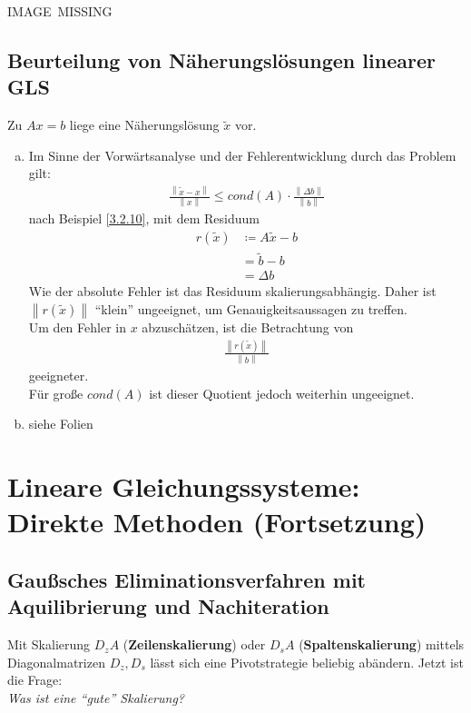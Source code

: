 \documentclass[ngerman,fontsize=11pt, paper=a4, parskip=half, titlepage=true, toc=bib]{scrbook}
\newcommand{\nn}[1]{\left\| #1 \right\|}
\newcommand{\sectione}[1]{\section{#1} \setcounter{equation}{0}}
\begin{document}
  IMAGE~MISSING
  
  \sectione{Beurteilung von Näherungslösungen linearer GLS}
  Zu $Ax=b$ liege eine Näherungslösung $\widetilde{x}$ vor.

  \begin{enumerate}[a)]
  	\item Im Sinne der Vorwärtsanalyse und der Fehlerentwicklung	
  			durch das Problem gilt:
  				\begin{gather*}
  					\frac{\nn{\widetilde{x}-x}}{\nn{x}} \leq cond(A) \cdot \frac{\nn{\Delta b}}{\nn{b}}
  				\end{gather*}
  			nach Beispiel \ref{3.2.10}, 
  			mit dem Residuum 
  			\begin{align}
  				r(\widetilde{x})  & \coloneqq A\widetilde{x} - b \label{III.4.1} \\ \nonumber 
  										  &	= \widetilde{b}-b \\ \nonumber
  										  & = \Delta b
  			\end{align}
  			Wie der absolute Fehler ist das Residuum skalierungsabhängig.
  			Daher ist $\nn{r(\widetilde{x})}$ \enquote{klein} ungeeignet, um
  			Genauigkeitsaussagen zu treffen. \\
  			Um den Fehler in $x$ abzuschätzen, ist die Betrachtung von 
  			\begin{gather}
  				\frac{\nn{r(\widetilde{x})}}{\nn{b}} \label{III.4.2}
  			\end{gather}
  			geeigneter. \\
  			Für große $cond(A)$ ist dieser Quotient jedoch weiterhin ungeeignet.
  			
  			\item siehe Folien
  \end{enumerate}
  
  
  \chapter{Lineare Gleichungssysteme: Direkte Methoden (Fortsetzung)}
  
  \sectione{Gaußsches Eliminationsverfahren mit Aquilibrierung und Nachiteration}
  
  Mit Skalierung $D_zA$ (\textbf{Zeilenskalierung}) oder
  $D_sA$ (\textbf{Spaltenskalierung})
  mittels Diagonalmatrizen $D_z, D_s$ lässt sich eine Pivotstrategie beliebig abändern.
  Jetzt ist die Frage: \\
  \textit{Was ist eine \enquote{gute} Skalierung?}
  
\end{document}
